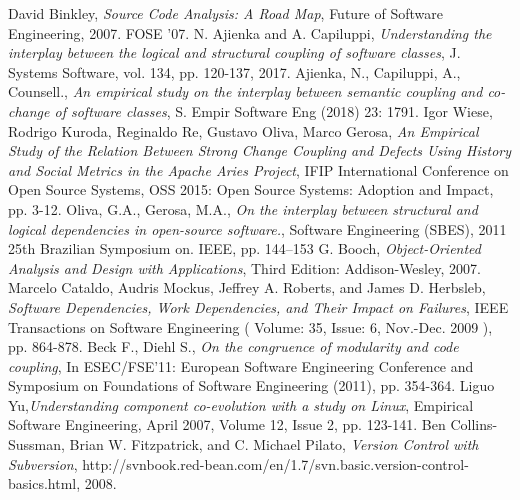 \documentclass[12pt,a4paper,oneside]{report}
\begin{document}


\tableofcontents

\newpage














\begin{thebibliography}{1}

David Binkley, \emph{Source Code Analysis: A Road Map}, Future of Software Engineering, 2007. FOSE '07.
N. Ajienka and A. Capiluppi, \emph{Understanding the interplay between the logical and structural coupling of software classes}, J. Systems Software, vol. 134, pp. 120-137, 2017.
Ajienka, N., Capiluppi, A., Counsell., \emph{An empirical study on the interplay between semantic coupling and co-change of software classes}, S. Empir Software Eng (2018) 23: 1791.
Igor Wiese, Rodrigo Kuroda, Reginaldo Re, Gustavo Oliva, Marco Gerosa, \emph{An Empirical Study of the Relation Between Strong Change Coupling and Defects Using History and Social Metrics in the Apache Aries Project}, IFIP International Conference on Open Source Systems, OSS 2015: Open Source Systems: Adoption and Impact, pp. 3-12.
Oliva, G.A., Gerosa, M.A., \emph{On the interplay between structural and logical dependencies in open-source software.}, Software Engineering (SBES), 2011 25th Brazilian Symposium on. IEEE, pp. 144–153
G. Booch, \emph{Object-Oriented Analysis and Design with Applications}, Third Edition: Addison-Wesley, 2007.
Marcelo Cataldo, Audris Mockus, Jeffrey A. Roberts, and James D. Herbsleb, \emph{Software Dependencies, Work Dependencies, and Their Impact on Failures},  IEEE Transactions on Software Engineering ( Volume: 35, Issue: 6, Nov.-Dec. 2009 ), pp. 864-878.
Beck F., Diehl S.,\emph{ On the congruence of modularity and code coupling}, In ESEC/FSE'11: European Software Engineering Conference and Symposium on Foundations of Software Engineering (2011), pp. 354-364.
Liguo Yu,\emph{Understanding component co-evolution with a study on Linux}, Empirical Software Engineering, April 2007, Volume 12, Issue 2, pp. 123-141.
 Ben Collins-Sussman, Brian W. Fitzpatrick, and C. Michael Pilato, \emph{Version Control with Subversion}, http://svnbook.red-bean.com/en/1.7/svn.basic.version-control-basics.html, 2008.

\end{thebibliography}
\end{document}
